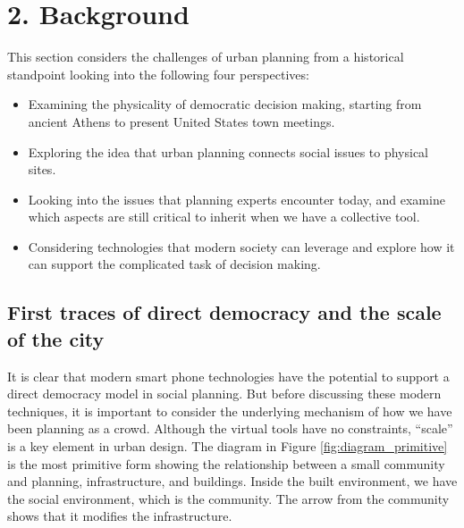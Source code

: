 \newcommand{\repeatcaption}[2]{%
  \renewcommand{\thefigure}{\ref{#1}}%
  \caption{#2 (repeated from page \pageref{#1})}%
}


\chapter{2. Background}

This section considers the challenges of urban planning from a historical standpoint looking into the following four perspectives:
\begin{itemize}
\item Examining the physicality of democratic decision making, starting from ancient Athens to present United States town meetings.
\item Exploring the idea that urban planning connects social issues to physical sites.
\item Looking into the issues that planning experts encounter today, and examine which aspects are still critical to inherit when we have a collective tool.
\item Considering technologies that modern society can leverage and explore how it can support the complicated task of decision making.
\end{itemize}

\section{First traces of direct democracy and the scale of the city}

It is clear that modern smart phone technologies  have the potential  to support a direct democracy model in social planning. But before discussing these modern techniques, it is important to consider the underlying mechanism of how we have been planning as a crowd. Although the virtual tools have no constraints, ``scale'' is a key element in urban design. The diagram in Figure \ref{fig:diagram_primitive} is the most primitive form showing the relationship between a small community and planning, infrastructure, and buildings.
 \cite{roof2008public}
Inside the built environment, we have the social environment, which is the community. The arrow from the community shows that it modifies the infrastructure.

